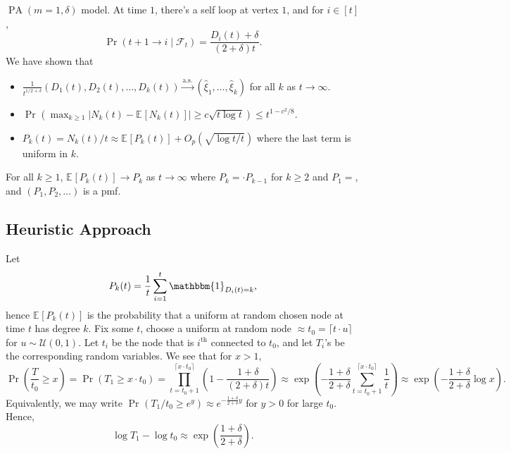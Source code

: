 \begin{prev}
	\(\operatorname{PA}(m = 1, \delta ) \) model. At time \(1\), there's a self loop at vertex \(1\), and for \(i \in [t]\),
	\[
		\Pr_{}\left(t + 1 \to i \mid \mathcal{F} _t\right)
		= \frac{D_i (t) + \delta }{(2 + \delta )t}.
	\]
	We have shown that
	\begin{itemize}
		\item \(\frac{1}{t^{1 / 2 + \delta }} (D_1(t), D_2(t), \dots , D_k(t)) \overset{\text{a.s.}}{\to} (\hat{\xi} _1, \dots , \hat{\xi} _k)\) for all \(k\) as \(t \to \infty \).
		\item \(\Pr_{}\left(\max _{k \geq 1} \lvert N_k(t) - \mathbb{E}_{}[N_k(t)] \rvert \geq c \sqrt{t \log t} \right) \leq t^{1 - c^2 / 8} \).
		\item \(P_k(t) = N_k(t) / t \approx \mathbb{E}_{}[P_k(t)] + O_p(\sqrt{\log t / t} )\) where the last term is uniform in \(k\).
	\end{itemize}
\end{prev}

\begin{theorem}
	For all \(k \geq 1\), \(\mathbb{E}_{}[P_k(t)] \to P_k\) as \(t \to \infty \) where \(P_k = \cdot P_{k-1}\) for \(k \geq 2\) and \(P_1 = \), and \((P_1, P_2, \dots )\) is a pmf.
\end{theorem}

\subsection{Heuristic Approach}
Let
\[
	P_k(t) = \frac{1}{t} \sum_{i=1}^{t} \mathbbm{1}_{D_i(t) = k} ,
\]
hence \(\mathbb{E}_{}[P_k(t)] \) is the probability that a uniform at random chosen node at time \(t\) has degree \(k\). Fix some \(t\), choose a uniform at random node \(\approx t_0 = \lceil t \cdot u \rceil \) for \(u \sim \mathcal{U} (0, 1)\). Let \(t_i\) be the node that is \(i^{\text{th} }\) connected to \(t_0\), and let \(T_i\)'s be the corresponding random variables. We see that for \(x > 1\),
\[
	\Pr_{}\left(\frac{T}{t_0} \geq x\right)
	= \Pr_{}\left(T_1 \geq x \cdot t_0\right)
	= \prod_{t=t_0 + 1}^{\lceil x \cdot t_0 \rceil } \left( 1 - \frac{1 + \delta }{(2 + \delta ) t} \right)
	\approx \exp (- \frac{1 + \delta }{2 + \delta } \sum_{t=t_0 + 1}^{\lceil x \cdot t_0 \rceil } \frac{1}{t} )
	\approx \exp (- \frac{1 + \delta }{2 + \delta } \log x).
\]
Equivalently, we may write \(\Pr_{}\left(T_1 / t_0 \geq e^y\right) \approx e^{- \frac{1 + \delta }{2 + \delta } y}\) for \(y > 0\) for large \(t_0\). Hence,
\[
	\log T_1 - \log t_0
	\approx \exp (\frac{1 + \delta }{2 + \delta }).
\]

